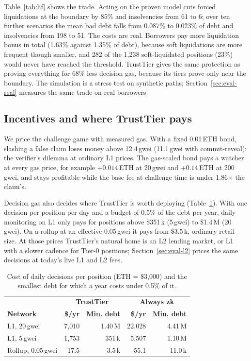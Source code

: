 \documentclass[sigconf,nonacm]{acmart}
\begin{document}
Table~\ref{tab:hf} shows the trade. Acting on the proven model cuts forced liquidations at the boundary by 85\% and insolvencies from 61 to 6; over ten further scenarios the mean bad debt falls from 0.087\% to 0.023\% of debt and insolvencies from 198 to 51. The costs are real. Borrowers pay more liquidation bonus in total (1.63\% against 1.35\% of debt), because soft liquidations are more frequent though smaller, and 282 of the 1,238 soft-liquidated positions (23\%) would never have reached the threshold. TrustTier gives the same protection as proving everything for 68\% less decision gas, because its tiers prove only near the boundary. The simulation is a stress test on synthetic paths; Section~\ref{sec:eval-real} measures the same trade on real borrowers.

\subsection{Incentives and where TrustTier pays}
\label{sec:eval-incentives}

We price the challenge game with measured gas. With a fixed 0.01\,ETH bond, slashing a false claim loses money above 12.4\,gwei (11.1\,gwei with commit-reveal): the verifier's dilemma at ordinary L1 prices. The gas-scaled bond pays a watcher at every gas price, for example $+0.014$\,ETH at 20\,gwei and $+0.14$\,ETH at 200\,gwei, and stays profitable while the base fee at challenge time is under 1.86$\times$ the claim's.

Decision gas also decides where TrustTier is worth deploying (Table~\ref{tab:viability}). With one decision per position per day and a budget of 0.5\% of the debt per year, daily monitoring on L1 only pays for positions above \$351\,k (5\,gwei) to \$1.4\,M (20\,gwei). On a rollup at an effective 0.05\,gwei it pays from \$3.5\,k, ordinary retail size. At those prices TrustTier's natural home is an L2 lending market, or L1 with a slower cadence for Tier-0 positions; Section~\ref{sec:eval-l2} prices the same decisions at today's live L1 and L2 fees.

\begin{table}[t]
  \caption{Cost of daily decisions per position (ETH = \$3,000) and the smallest debt for which a year costs under 0.5\% of it.}
  \label{tab:viability}
  \footnotesize
  \setlength{\tabcolsep}{3pt}
  \begin{tabular}{@{}lrrrr@{}}
    \toprule
    & \multicolumn{2}{c}{\textbf{TrustTier}} & \multicolumn{2}{c}{\textbf{Always zk}} \\
    \textbf{Network} & \textbf{\$/yr} & \textbf{Min. debt} & \textbf{\$/yr} & \textbf{Min. debt} \\
    \midrule
    L1, 20\,gwei & 7,010 & 1.40\,M & 22,028 & 4.41\,M \\
    L1, 5\,gwei & 1,753 & 351\,k & 5,507 & 1.10\,M \\
    Rollup, 0.05\,gwei & 17.5 & 3.5\,k & 55.1 & 11.0\,k \\
    \bottomrule
  \end{tabular}
\end{table}
\end{document}
